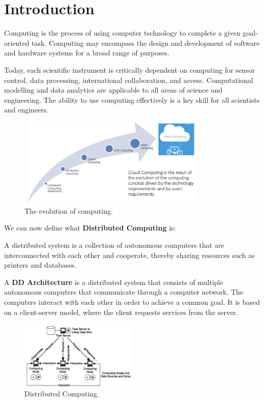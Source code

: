 
\chapter{Introduction}

\begin{definitionblock}
    Computing is the process of using computer technology to complete a given goal-oriented task. Computing may encompass the design and development of software and hardware systems for a broad range of purposes. 
\end{definitionblock}

Today, each scientific instrument is critically dependent on computing
for sensor control, data processing, international collaboration,
and access. Computational modelling and data analytics are applicable to all
areas of science and engineering. The ability to use computing
effectively is a key skill for all scientists and engineers.

\begin{figure}[H]
    \centering
    \includegraphics[width=0.8\textwidth]{assets/fig1.png}
    \caption{The evolution of computing.}
    \label{fig:1}
\end{figure}

We can now define what \textbf{Distributed Computing} is:
\begin{definitionblock}
    A distributed system is a collection of autonomous computers that are interconnected with each other and cooperate, thereby sharing resources such as printers and databases.
\end{definitionblock}

A \textbf{DD Architecture} is a distributed system that consists of multiple autonomous computers that communicate through a computer network. The computers interact with each other in order to achieve a common goal. It is based on a client-server model, where the client requests services from the server.

\begin{figure}[H]
    \centering
    \includegraphics[width=0.5\textwidth]{assets/fig2.png}
    \caption{Distributed Computing.}
    \label{fig:2}
\end{figure}


